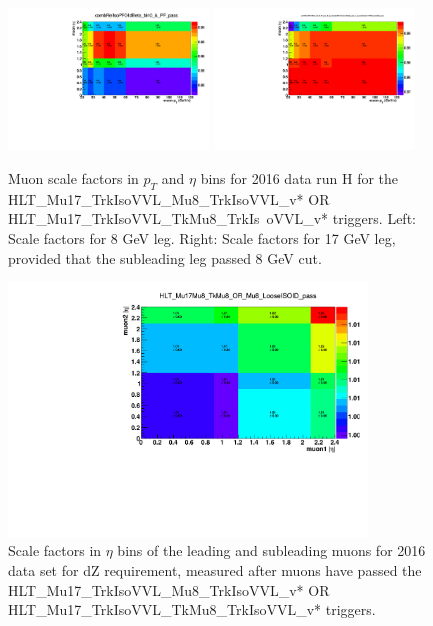 \begin{figure}
\centering
\includegraphics[width=0.475\textwidth]{figures/trigger/Run_H_PlotSF_hlt_Mu17_Mu8_OR_TkMu8_leg8_NUM_hlt_Mu17_Mu8_OR_TkMu8_leg8_DEN_LooseIDnISO_PAR_pt_eta_pt_abseta_ratio.pdf}
\includegraphics[width=0.475\textwidth]{figures/trigger/Run_H_PlotSF_hlt_Mu17Mu8_leg17_NUM_hlt_Mu17Mu8_leg17_DEN_LooseIDnISO_PAR_pt_eta_pt_abseta_ratio.pdf}\\
\caption{Muon scale factors in $p_{T}$ and $\eta$ bins for 2016 data run H for the  HLT\_Mu17\_TrkIsoVVL\_Mu8\_TrkIsoVVL\_v* OR HLT\_Mu17\_TrkIsoVVL\_TkMu8\_TrkIs\
oVVL\_v* triggers. Left: Scale factors for 8 GeV leg. Right: Scale factors for 17 GeV leg, provided that the subleading leg passed 8 GeV cut.}

\label{fig:trigger_SF_dimu_H}
\end{figure}

\begin{figure}
\centering
\includegraphics[width=0.85\textwidth]{figures/trigger/PlotSF_dZ_NUM_dZ_DEN_hlt_Mu17_Mu8_OR_TkMu8_loose_PAR_eta1_eta2_abseta_tag_abseta_ratio.pdf}
\caption{Scale factors in $\eta$ bins of the leading and subleading muons for 2016 data set for dZ requirement, measured after muons have passed the HLT\_Mu17\_TrkIsoVVL\_Mu8\_TrkIsoVVL\_v* OR HLT\_Mu17\_TrkIsoVVL\_TkMu8\_TrkIsoVVL\_v* triggers. }
\label{fig:trigger_SF_dimu_dZ_H}
\end{figure}



